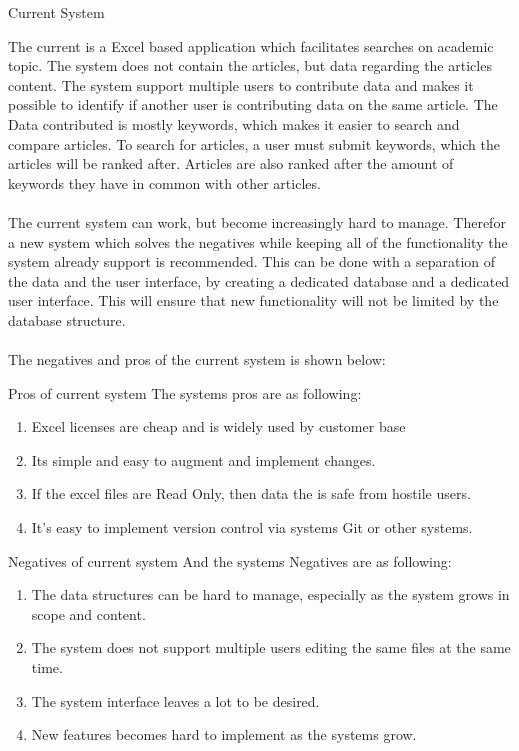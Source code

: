 \begin{section}{Current System}

The current is a Excel based application which facilitates searches on academic topic. The system does not contain the articles, but data regarding the articles content. 
The system support multiple users to contribute data and makes it possible to identify if another user is contributing data on the same article. The Data contributed is mostly keywords, which makes it easier to search and compare articles. 
To search for articles, a user must submit keywords, which the articles will be ranked after. Articles are also ranked after the amount of keywords they have in common with other articles. \\\\The current system can work, but become increasingly hard to manage. Therefor a new system which solves the negatives while keeping all of the functionality the system already support is recommended. This can be done with a separation of the data and the user interface, by creating a dedicated database and a dedicated user interface. This will ensure that new functionality will not be limited by the database structure. \\
\\The negatives and pros of the current system is shown below:
\begin{subsubsection}{Pros of current system}
The systems pros are as following:
\begin{enumerate}
	\item Excel licenses are cheap and is widely used by customer base
	\item Its simple and easy to augment and implement changes.
	\item If the excel files are Read Only, then data the is safe from hostile users.
	\item It's easy to implement version control via systems Git or other systems.
\end{enumerate}
\end{subsubsection}

\begin{subsubsection}{Negatives of current system} 
And the systems Negatives are as following: 
\begin{enumerate}
	\item The data structures can be hard to manage, especially as the system grows in scope and content.
	\item The system does not support multiple users editing the same files at the same time.
	\item The system interface leaves a lot to be desired.
	\item New features becomes hard to implement as the systems grow.
\end{enumerate}
\end{subsubsection}

\end{section}